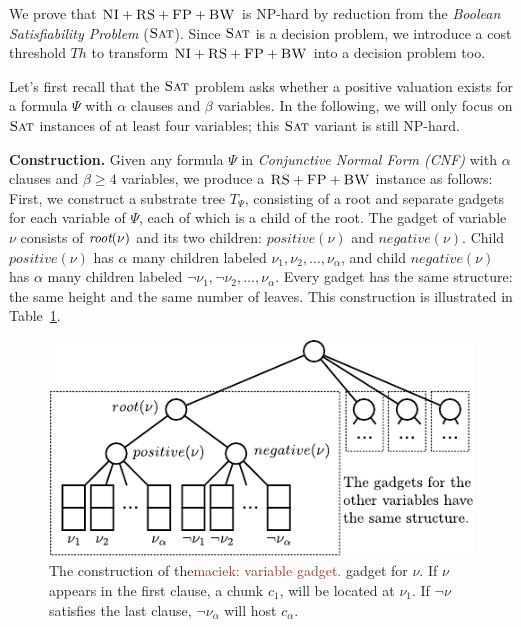 \documentclass[9pt]{sigcomm-alternate}
\newcommand{\maciek}[1]{\textcolor{brown}{maciek: #1}}
\newcommand{\variab}{\nu}
\newcommand{\aroot}{\emph{root}}
\newcommand{\clauses}{\alpha}
\newcommand{\variables}{\beta}
\newcommand{\achunk}{\ensuremath{c}}
\newcommand{\CC}{\textsc{NI}}
\newcommand{\FP}{\textsc{FP}}
\newcommand{\RS}{\textsc{RS}}
\newcommand{\BW}{\textsc{BW}}
\newcommand{\Tree}{\ensuremath{T}}
\newcommand{\SAT}{\textsc{Sat}}
\newcommand{\Formula}{\ensuremath{\Psi}}
\newcommand{\Thr}{\ensuremath{Th}}
\newcommand{\positive}{\ensuremath{positive}}
\newcommand{\negative}{\ensuremath{negative}}
\begin{document}
\begin{appendix}

We prove that $\CC+\RS+\FP+\BW$ is NP-hard by reduction from the \emph{Boolean Satisfiability Problem} ($\SAT$).
Since $\SAT$ is a decision
problem, we
introduce a cost threshold $\Thr$ to transform $\CC+\RS+\FP+\BW$ into a decision problem too.

Let's first recall that the $\SAT$ problem asks whether a positive valuation exists
for a formula $\Formula$ with $\clauses$ clauses and $\variables$
variables.
In the following, we will only focus on $\SAT$ instances of at least four variables;
this $\SAT$ variant is still NP-hard.

\textbf{Construction.}
Given any formula $\Formula$ in \emph{Conjunctive Normal Form (CNF)} with
$\clauses$ clauses and $\variables \geq 4$ variables, we produce
a $\RS+\FP+\BW$ instance as follows: First, we construct a substrate tree
$\Tree_{\Formula}$, consisting of
a root and separate gadgets for each variable of $\Formula$, each of which
is a child of the root.
The gadget of variable $\variab$ consists of $\aroot(\variab)$ and its two children:
$\positive(\variab)$ and $\negative(\variab)$. Child $\positive(\variab)$ has $\clauses$
many children labeled $\nu_1, \nu_2, \ldots,
\nu_{\clauses}$, and child
$\negative(\variab)$ has
$\clauses$ many children labeled $\neg \nu_1, \neg \nu_2, \dots,
\nu_{\clauses}$. Every
gadget has the same structure: the same height and the same number of
leaves. This construction is illustrated in
Table~\ref{fig:construction_3sat}.


\begin{figure}
\includegraphics[width=\columnwidth]{figs/construction_3sat}
\caption{The construction of the\maciek{variable gadget.} gadget for $\nu$. If $\nu$ appears in the
first clause, a chunk $\achunk_1$, will be located at $\nu_1$. If $\neg \nu$
satisfies the last clause, $\neg
\nu_\alpha$ will host $\achunk_\alpha$.}
\label{fig:construction_3sat}
\end{figure}


\end{appendix}
\end{document}
